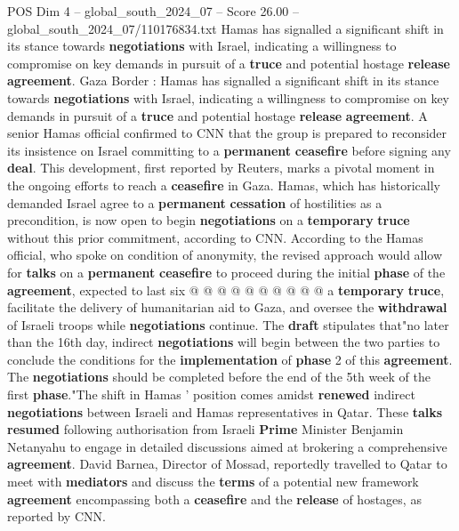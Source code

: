 \begin{textsample}{POS Dim 4 – global\_south\_2024\_07 – Score 26.00 – global\_south\_2024\_07/110176834.txt}  \label{ex:f4_pos_114}
Hamas has signalled a significant shift in its stance towards \textbf{negotiations} with Israel, indicating a willingness to compromise on key demands in pursuit of a \textbf{truce} and potential hostage \textbf{release} \textbf{agreement}.
Gaza Border : Hamas has signalled a significant shift in its stance towards \textbf{negotiations} with Israel, indicating a willingness to compromise on key demands in pursuit of a \textbf{truce} and potential hostage \textbf{release} \textbf{agreement}.
A senior Hamas official confirmed to CNN that the group is prepared to reconsider its insistence on Israel committing to a \textbf{permanent} \textbf{ceasefire} before signing any \textbf{deal}.
This development, first reported by Reuters, marks a pivotal moment in the ongoing efforts to reach a \textbf{ceasefire} in Gaza.
Hamas, which has historically demanded Israel agree to a \textbf{permanent} \textbf{cessation} of hostilities as a precondition, is now open to begin \textbf{negotiations} on a \textbf{temporary} \textbf{truce} without this prior commitment, according to CNN.
According to the Hamas official, who spoke on condition of anonymity, the revised approach would allow for \textbf{talks} on a \textbf{permanent} \textbf{ceasefire} to proceed during the initial \textbf{phase} of the \textbf{agreement}, expected to last six @ @ @ @ @ @ @ @ @ @ a \textbf{temporary} \textbf{truce}, facilitate the delivery of humanitarian aid to Gaza, and oversee the \textbf{withdrawal} of Israeli troops while \textbf{negotiations} continue.
The \textbf{draft} stipulates that"no later than the 16th day, indirect \textbf{negotiations} will begin between the two parties to conclude the conditions for the \textbf{implementation} of \textbf{phase} 2 of this \textbf{agreement}.
The \textbf{negotiations} should be completed before the end of the 5th week of the first \textbf{phase}."The shift in Hamas ' position comes amidst \textbf{renewed} indirect \textbf{negotiations} between Israeli and Hamas representatives in Qatar.
These \textbf{talks} \textbf{resumed} following authorisation from Israeli \textbf{Prime} Minister Benjamin Netanyahu to engage in detailed discussions aimed at brokering a comprehensive \textbf{agreement}.
David Barnea, Director of Mossad, reportedly travelled to Qatar to meet with \textbf{mediators} and discuss the \textbf{terms} of a potential new framework \textbf{agreement} encompassing both a \textbf{ceasefire} and the \textbf{release} of hostages, as reported by CNN.

\end{textsample}
